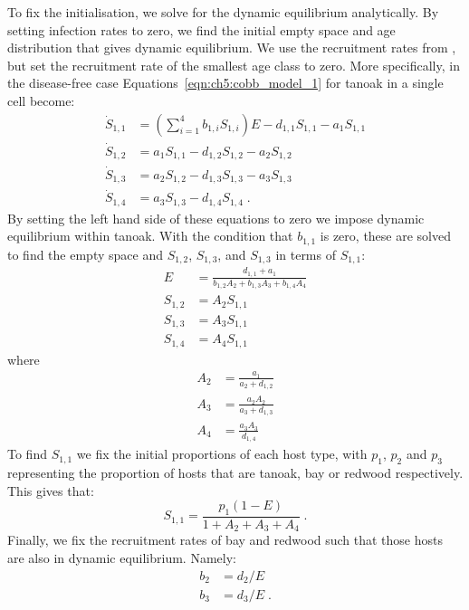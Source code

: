 To fix the initialisation, we solve for the dynamic equilibrium analytically. By setting infection rates to zero, we find the initial empty space and age distribution that gives dynamic equilibrium. We use the recruitment rates from \citet{cobb_ecosystem_2012}, but set the recruitment rate of the smallest age class to zero. More specifically, in the disease-free case Equations~\ref{eqn:ch5:cobb_model_1} for tanoak in a single cell become:
\begin{subequations}
\begin{align}
    \dot{S}_{1,1} &= \left(\sum_{i=1}^4b_{1,i}S_{1,i}\right)E - d_{1,1}S_{1,1} - a_1S_{1,1}\\
    \dot{S}_{1,2} &= a_1S_{1,1} - d_{1,2}S_{1,2} - a_2S_{1,2}\\
    \dot{S}_{1,3} &= a_2S_{1,2} - d_{1,3}S_{1,3} - a_3S_{1,3}\\
    \dot{S}_{1,4} &= a_3S_{1,3} - d_{1,4}S_{1,4} \;.
\end{align}
\end{subequations}
By setting the left hand side of these equations to zero we impose dynamic equilibrium within tanoak. With the condition that $b_{1,1}$ is zero, these are solved to find the empty space and $S_{1,2}$, $S_{1,3}$, and $S_{1,3}$ in terms of $S_{1,1}$:
\begin{subequations}\label{eqn:ch5:tan_init}
    \begin{align}
        E &= \frac{d_{1,1} + a_1}{b_{1,2}A_2 + b_{1,3}A_3 + b_{1,4}A_4}\\
        S_{1,2} &= A_2S_{1,1}\\
        S_{1,3} &= A_3S_{1,1}\\
        S_{1,4} &= A_4S_{1,1}
    \end{align}
    \end{subequations}
where
\begin{subequations}
\begin{align}
    A_2 &= \frac{a_1}{a_2+d_{1,2}}\\
    A_3 &= \frac{a_2A_2}{a_3+d_{1,3}}\\
    A_4 &= \frac{a_3A_3}{d_{1,4}}
\end{align}
\end{subequations}
To find $S_{1,1}$ we fix the initial proportions of each host type, with $p_1$, $p_2$ and $p_3$ representing the proportion of hosts that are tanoak, bay or redwood respectively. This gives that:
\begin{equation}
    \label{eqn:ch5:tan_0_init}
    S_{1,1} = \frac{p_1(1-E)}{1+A_2+A_3+A_4}\;.
\end{equation}
Finally, we fix the recruitment rates of bay and redwood such that those hosts are also in dynamic equilibrium. Namely:
\begin{subequations}
\begin{align}
    b_2 &= d_2 / E \\
    b_3 &= d_3 / E \;.
\end{align}
\end{subequations}

